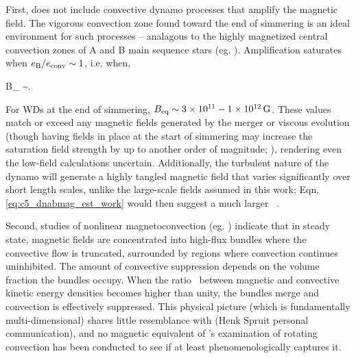 
First, \citeal{stev79} does not include convective dynamo processes that amplify the magnetic field.  The vigorous convection zone found toward the end of simmering is an ideal environment for such processes -- analagous to the highly magnetized central convection zones of A and B main sequence stars (eg. \citealt{brunbt05, feat+09, augubt16}).  Amplification saturates when $\EBEconv \sim 1$, i.e. when, 

\eqbegin
B_ \sim \vconv\sqrt{8\pi\rho}.
\eqend

\noindent For WDs at the end of simmering, $B_\mathrm{eq} \sim 3\times10^{11}-1\times10^{12}\,\mathrm{G}$.  These values match or exceed any magnetic fields generated by the merger or viscous evolution (though having fields in place at the start of simmering may increase the saturation field strength by up to another order of magnitude; \citealt{feat+09}), rendering even the low-field calculations uncertain.  Additionally, the turbulent nature of the dynamo will generate a highly tangled magnetic field that varies significantly over short length scales, unlike the large-scale fields assumed in this work; Eqn. \ref{eq:c5_dnabmag_est_work} would then suggest a much larger \dnabmag\ \citep{chabgb07}.

Second, studies of nonlinear magnetoconvection (eg. \citealt{procw82}) indicate that in steady state, magnetic fields are concentrated into high-flux bundles where the convective flow is truncated, surrounded by regions where convection continues uninhibited.  The amount of convective suppression depends on the volume fraction the bundles occupy.  When the ratio \EBEconv\ between magnetic and convective kinetic energy densities becomes higher than unity, the bundles merge and convection is effectively suppressed.  This physical picture (which is fundamentally multi-dimensional) shares little resemblance with \citeal{stev79} (Henk Spruit personal communication), and no magnetic equivalent of \cite{barkdl14}'s examination of rotating convection has been conducted to see if \citeal{stev79} at least phenomenologically captures it.


